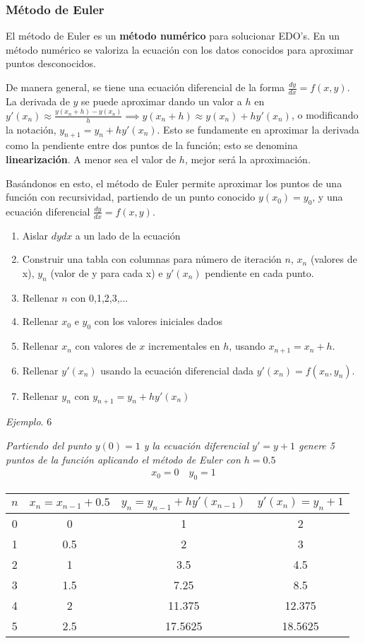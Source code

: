 \documentclass[spanish,12pt]{article}
\newcommand{\dydx}{\frac{dy}{dx}}
\begin{document}
\subsubsection{Método de Euler}

El método de Euler es un \textbf{método numérico} para solucionar EDO's. En un método numérico se valoriza la ecuación con los datos conocidos para aproximar puntos desconocidos.

De manera general, se tiene una ecuación diferencial de la forma $\dydx=f(x,y)$. La derivada de $y$ se puede aproximar dando un valor a $h$ en $y'(x_n)\approx\frac{y(x_n+h)-y(x_n)}{h}\implies  y(x_n+h) \approx y(x_n)+hy'(x_n)$, o modificando la notación, $y_{n+1} =y_n+hy'(x_n)$. Esto se fundamente en aproximar la derivada como la pendiente entre dos puntos de la función; esto se denomina \textbf{linearización}. A menor sea el valor de $h$, mejor será la aproximación.

Basándonos en esto, el método de Euler permite aproximar los puntos de una función con recursividad, partiendo de un punto conocido $y(x_0)=y_0$, y una ecuación diferencial $\dydx=f(x,y)$.
\begin{enumerate}
    \item Aislar $dydx$ a un lado de la ecuación
    \item Construir una tabla con columnas para número de iteración $n$, $x_n$ (valores de x), $y_n$ (valor de y para cada x) e $y'(x_n)$ pendiente en cada punto. 
    \item Rellenar $n$ con 0,1,2,3,...
    \item Rellenar $x_0$ e $y_0$ con los valores iniciales dados
    \item Rellenar $x_n$ con valores de $x$ incrementales en $h$, usando $x_{n+1}=x_n+h$.
    \item Rellenar $y'(x_n)$ usando la ecuación diferencial dada $y'(x_n)=f(x_n,y_n)$.
    \item Rellenar $y_n$ con $y_{n+1} =y_n+hy'(x_n)$ 
\end{enumerate}

\textit{Ejemplo}. 6

\textit{Partiendo del punto $y(0)=1$ y la ecuación diferencial $y'=y+1$ genere 5 puntos de la función aplicando el método de Euler con $h=0.5$}
\begin{align*}
    x_0=0\quad y_0=1
\end{align*}
\begin{center}
\begin{tabular}{c|c|c|c}
    $n$ & $x_n=x_{n-1}+0.5$ & $y_n=y_{n-1}+hy'(x_{n-1})$ & $y'(x_n)=y_n+1$ \\
     \hline
    0 & 0 & 1 & 2 \\
    1 & 0.5 & 2 & 3 \\
    2 & 1 & 3.5 & 4.5 \\
    3 & 1.5 & 7.25 & 8.5 \\
    4 & 2 & 11.375 & 12.375 \\
    5 & 2.5 & 17.5625 & 18.5625 \\
\end{tabular}
\end{center}
\end{document}
